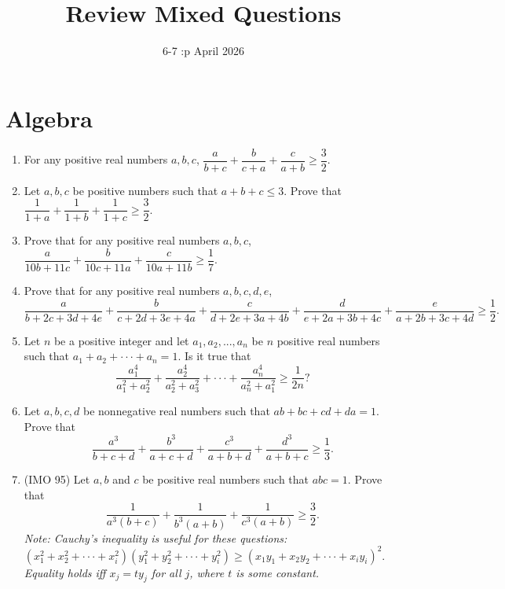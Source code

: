 \documentclass[12pt]{scrartcl}
\begin{document}
\title{Review Mixed Questions}
\date{6-7 :p April 2026}
\maketitle

\renewcommand*\contentsname{Daftar Isi}
\tableofcontents

\newpage


\section*{Algebra}

\begin{enumerate}
    \item For any positive real numbers $a, b, c$, $\dfrac{a}{b+c}+\dfrac{b}{c+a}+\dfrac{c}{a+b}\ge\dfrac{3}{2}.$
    
    \item Let $a, b, c$ be positive numbers such that $a+b+c\le3$. Prove that $\dfrac{1}{1+a}+\dfrac{1}{1+b}+\dfrac{1}{1+c}\ge\dfrac{3}{2}.$
    
    \item Prove that for any positive real numbers $a, b, c$, $\dfrac{a}{10b+11c}+\dfrac{b}{10c+11a}+\dfrac{c}{10a+11b}\ge\dfrac{1}{7}.$
    
    \item Prove that for any positive real numbers $a, b, c, d, e$, 
    $$\dfrac{a}{b+2c+3d+4e}+\dfrac{b}{c+2d+3e+4a}+\dfrac{c}{d+2e+3a+4b}+\dfrac{d}{e+2a+3b+4c}+\dfrac{e}{a+2b+3c+4d}\ge\dfrac{1}{2}.$$
    
    \item Let $n$ be a positive integer and let $a_{1},a_{2},...,a_{n}$ be $n$ positive real numbers such that $a_{1}+a_{2}+\cdot\cdot\cdot+a_{n}=1$. Is it true that 
    $$\dfrac{a_{1}^{4}}{a_{1}^{2}+a_{2}^{2}}+\dfrac{a_{2}^{4}}{a_{2}^{2}+a_{3}^{2}}+\cdot\cdot\cdot+\dfrac{a_{n}^{4}}{a_{n}^{2}+a_{1}^{2}}\ge\dfrac{1}{2n}?$$
    
    \item Let $a, b, c, d$ be nonnegative real numbers such that $ab+bc+cd+da=1$. Prove that 
    $$\dfrac{a^{3}}{b+c+d}+\dfrac{b^{3}}{a+c+d}+\dfrac{c^{3}}{a+b+d}+\dfrac{d^{3}}{a+b+c}\ge\dfrac{1}{3}.$$
    
    \item (IMO 95) Let $a, b$ and $c$ be positive real numbers such that $abc=1$. Prove that 
    $$\dfrac{1}{a^{3}(b+c)}+\dfrac{1}{b^{3}(a+b)}+\dfrac{1}{c^{3}(a+b)}\ge\dfrac{3}{2}.$$
    \textit{Note: Cauchy's inequality is useful for these questions: $(x_{1}^{2}+x_{2}^{2}+\cdot\cdot\cdot+x_{i}^{2})(y_{1}^{2}+y_{2}^{2}+\cdot\cdot\cdot+y_{i}^{2})\ge(x_{1}y_{1}+x_{2}y_{2}+\cdot\cdot\cdot+x_{i}y_{i})^{2}.$ Equality holds iff $x_{j}=ty_{j}$ for all $j$, where $t$ is some constant.}


\end{enumerate}
\end{document}
